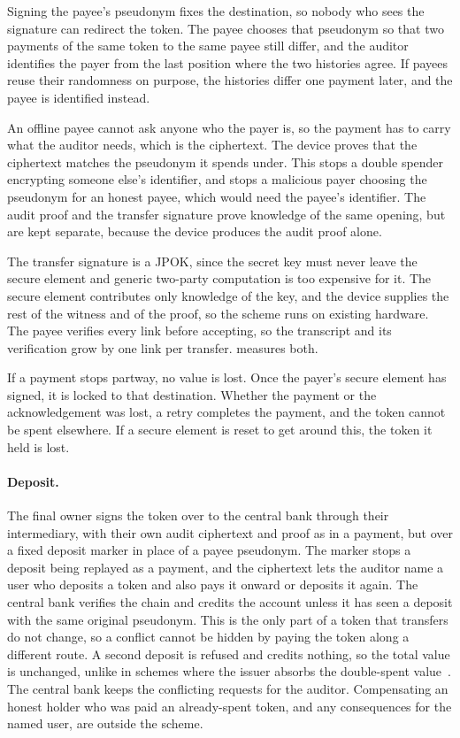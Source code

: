 Signing the payee's pseudonym fixes the destination, so nobody who sees the
signature can redirect the token. The payee chooses that pseudonym so that two
payments of the same token to the same payee still differ, and the auditor
identifies the payer from the last position where the two histories agree. If
payees reuse their randomness on purpose, the histories differ one payment
later, and the payee is identified instead.

An offline payee cannot ask anyone who the payer is, so the payment has to carry
what the auditor needs, which is the ciphertext. The device
proves that the ciphertext matches the pseudonym it spends under. This stops a
double spender encrypting someone else's identifier, and stops a malicious payer
choosing the pseudonym for an honest payee, which would need the payee's
identifier. The audit proof and the transfer signature prove knowledge of the
same opening, but are kept separate, because the device produces the audit
proof alone.

The transfer signature is a JPOK, since the secret key must never leave the
secure element and generic two-party computation is too expensive for it. The secure
element contributes only knowledge of the key, and the device supplies the rest
of the witness and of the proof, so the scheme runs on existing hardware. The
payee verifies every link before accepting, so the transcript and its
verification grow by one link per transfer. 
measures both.

If a payment stops partway, no value is lost. Once the payer's secure element
has signed, it is locked to that destination. Whether the payment or the
acknowledgement was lost, a retry completes the payment, and the token cannot be
spent elsewhere. If a secure element is reset to get around this, the
token it held is lost.

\paragraph{Deposit.} The final owner signs the token over to the central bank
through their intermediary, with their own audit ciphertext and proof as in a
payment, but over a fixed deposit marker in place of a payee pseudonym. The
marker stops a deposit being replayed as a payment, and the ciphertext lets the
auditor name a user who deposits a token and also pays it onward or deposits it
again. The central bank verifies the chain and credits the account unless it
has seen a deposit with the same original pseudonym. This is the only part of a
token that transfers do not change, so a conflict cannot be hidden by paying
the token along a different route. A second deposit is refused and credits
nothing, so the total value is unchanged, unlike in schemes where the issuer
absorbs the double-spent value~\cite{Beer2024}. The central bank keeps the
conflicting requests for the auditor. Compensating an honest holder who was
paid an already-spent token, and any consequences for the named user, are
outside the scheme.

